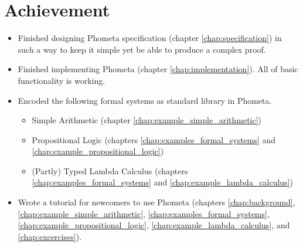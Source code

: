 \documentclass[master.tex]{subfiles}
\begin{document}
\section{Achievement}
\begin{itemize}
\item Finished designing Phometa specification (chapter
  \ref{chap:specification}) in such a way to keep it simple yet be able to
  produce a complex proof.
\item Finished implementing Phometa (chapter \ref{chap:implementation}). All of
  basic functionality is working.
\item Encoded the following formal systems as standard library in Phometa.
  \begin{itemize}
  \item Simple Arithmetic (chapter \ref{chap:example_simple_arithmetic})
  \item Propositional Logic (chapters \ref{chap:examples_formal_systems} and
    \ref{chap:example_propositional_logic})
  \item (Partly) Typed Lambda Calculus (chapters
    \ref{chap:examples_formal_systems} and \ref{chap:example_lambda_calculus})
  \end{itemize}
\item Wrote a tutorial for newcomers to use Phometa (chapters
  \ref{chap:background}, \ref{chap:example_simple_arithmetic},
  \ref{chap:examples_formal_systems},
  \ref{chap:example_propositional_logic},
  \ref{chap:example_lambda_calculus}, and
  \ref{chap:excercises}).
\end{itemize}
\end{document}

